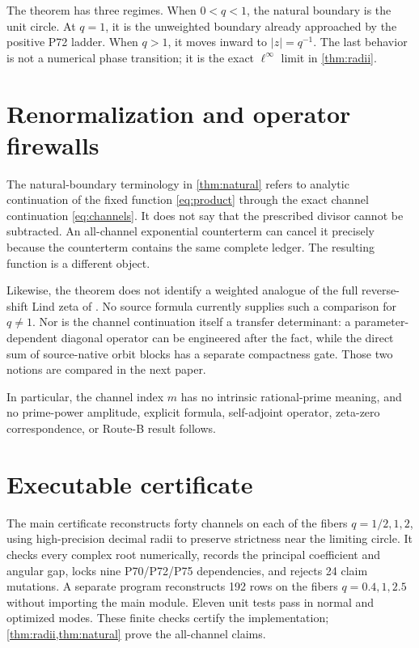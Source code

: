 \documentclass[11pt]{article}
\begin{document}
The theorem has three regimes.  When $0<q<1$, the natural boundary is the
unit circle.  At $q=1$, it is the unweighted boundary already approached by
the positive P72 ladder.  When $q>1$, it moves inward to $|z|=q^{-1}$.
The last behavior is not a numerical phase transition; it is the exact
$\ell^\infty$ limit in \cref{thm:radii}.

\section{Renormalization and operator firewalls}

The natural-boundary terminology in \cref{thm:natural} refers to analytic
continuation of the fixed function \eqref{eq:product} through the exact
channel continuation \eqref{eq:channels}.  It does not say that the
prescribed divisor cannot be subtracted.  An all-channel exponential
counterterm can cancel it precisely because the counterterm contains the
same complete ledger.  The resulting function is a different object.

Likewise, the theorem does not identify a weighted analogue of the
full reverse-shift Lind zeta of \citet{KimLeePark2003}.  No source formula
currently supplies such a comparison for $q\ne1$.  Nor is the channel
continuation itself a transfer determinant: a parameter-dependent diagonal
operator can be engineered after the fact, while the direct sum of
source-native orbit blocks has a separate compactness gate.  Those two
notions are compared in the next paper.

In particular, the channel index $m$ has no intrinsic rational-prime
meaning, and no prime-power amplitude, explicit formula, self-adjoint
operator, zeta-zero correspondence, or Route-B result follows.

\section{Executable certificate}

The main certificate reconstructs forty channels on each of the fibers
$q=1/2,1,2$, using high-precision decimal radii to preserve strictness near
the limiting circle.  It checks every complex root numerically, records the
principal coefficient and angular gap, locks nine P70/P72/P75 dependencies, and
rejects 24 claim mutations.  A separate program reconstructs 192 rows on
the fibers $q=0.4,1,2.5$ without importing the main module.  Eleven unit tests
pass in normal and optimized modes.  These finite checks certify the
implementation; \cref{thm:radii,thm:natural} prove the all-channel claims.



\end{document}
